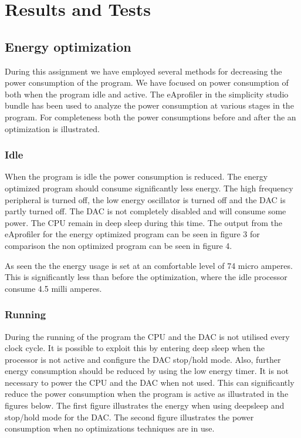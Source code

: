 \section{Results and Tests}

\subsection{Energy optimization}
During this assignment we have employed several methods for decreasing the power consumption of the program. We have focused on power consumption of both when the program idle and active. The eAprofiler in the simplicity studio bundle has been used to analyze the power consumption at various stages in the program. For completeness both the power consumptions before and after the an optimization is illustrated.


\subsubsection{Idle}
When the program is idle the power consumption is reduced. The energy optimized program should consume   significantly less energy. The high frequency peripheral is turned off, the low energy oscillator is turned off and the DAC is partly turned off. The DAC is not completely disabled and will consume some power. The CPU remain in deep sleep during this time. The output from the eAprofiler for the energy optimized program can be seen in figure 3 for comparison the non optimized program can be seen in figure 4. 





As seen the the energy usage is set at an comfortable level of 74 micro amperes. This is significantly less than before the optimization, where the idle processor consume 4.5 milli amperes.  




\subsubsection{Running}
During the running of the program the CPU and the DAC is not utilised every clock cycle. It is possible to exploit this by entering deep sleep when the processor is not active and configure the DAC stop/hold mode. Also, further energy consumption should be reduced by using the low energy timer. It is not necessary to power the CPU and the DAC when not used. This can significantly reduce the power consumption when the program is active as illustrated in the figures below. The first figure illustrates the energy when using deepsleep and stop/hold mode for the DAC. The second figure illustrates the power consumption when no optimizations techniques are in use.


